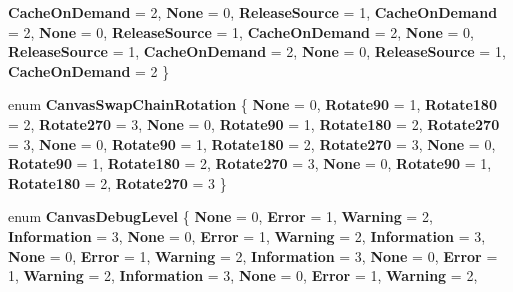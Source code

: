 \begin{DoxyCompactItemize}
{\bfseries Cache\+On\+Demand} = 2, 
{\bfseries None} = 0, 
\newline
{\bfseries Release\+Source} = 1, 
{\bfseries Cache\+On\+Demand} = 2, 
{\bfseries None} = 0, 
{\bfseries Release\+Source} = 1, 
\newline
{\bfseries Cache\+On\+Demand} = 2, 
{\bfseries None} = 0, 
{\bfseries Release\+Source} = 1, 
{\bfseries Cache\+On\+Demand} = 2, 
\newline
{\bfseries None} = 0, 
{\bfseries Release\+Source} = 1, 
{\bfseries Cache\+On\+Demand} = 2
 \}
\item 
\mbox{\label{namespace_microsoft_1_1_graphics_1_1_canvas_a1cf1111048d43d97b2294d0ff727e25c}} 
enum {\bfseries Canvas\+Swap\+Chain\+Rotation} \{ \newline
{\bfseries None} = 0, 
{\bfseries Rotate90} = 1, 
{\bfseries Rotate180} = 2, 
{\bfseries Rotate270} = 3, 
\newline
{\bfseries None} = 0, 
{\bfseries Rotate90} = 1, 
{\bfseries Rotate180} = 2, 
{\bfseries Rotate270} = 3, 
\newline
{\bfseries None} = 0, 
{\bfseries Rotate90} = 1, 
{\bfseries Rotate180} = 2, 
{\bfseries Rotate270} = 3, 
\newline
{\bfseries None} = 0, 
{\bfseries Rotate90} = 1, 
{\bfseries Rotate180} = 2, 
{\bfseries Rotate270} = 3, 
\newline
{\bfseries None} = 0, 
{\bfseries Rotate90} = 1, 
{\bfseries Rotate180} = 2, 
{\bfseries Rotate270} = 3
 \}
\item 
\mbox{\label{namespace_microsoft_1_1_graphics_1_1_canvas_a2ef0aec53b3f7fd6d2b7d2fe3f4cec34}} 
enum {\bfseries Canvas\+Debug\+Level} \{ \newline
{\bfseries None} = 0, 
{\bfseries Error} = 1, 
{\bfseries Warning} = 2, 
{\bfseries Information} = 3, 
\newline
{\bfseries None} = 0, 
{\bfseries Error} = 1, 
{\bfseries Warning} = 2, 
{\bfseries Information} = 3, 
\newline
{\bfseries None} = 0, 
{\bfseries Error} = 1, 
{\bfseries Warning} = 2, 
{\bfseries Information} = 3, 
\newline
{\bfseries None} = 0, 
{\bfseries Error} = 1, 
{\bfseries Warning} = 2, 
{\bfseries Information} = 3, 
\newline
{\bfseries None} = 0, 
{\bfseries Error} = 1, 
{\bfseries Warning} = 2, 

\end{DoxyCompactItemize}
